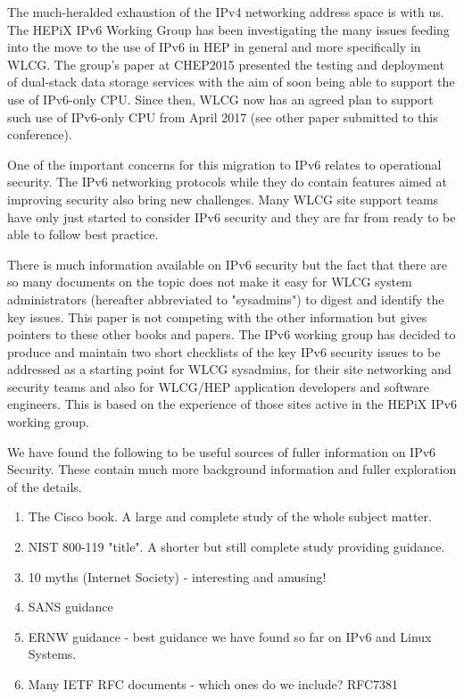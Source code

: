The much-heralded exhaustion of the IPv4 networking address space is with us. The HEPiX
IPv6 Working Group \cite{ipv6wg} has been investigating the many issues feeding into the move to the use of IPv6 in HEP in general and more specifically in WLCG. The group's paper at CHEP2015 \cite{ipv6chep2015} presented the testing and deployment of dual-stack data storage services with the aim of soon being able to support the use of IPv6-only CPU. Since then, WLCG now has an agreed plan to support such use of IPv6-only CPU from April 2017 (see other paper submitted to this conference).

One of the important concerns for this migration to IPv6 relates to operational security. The IPv6 networking protocols while they do contain features aimed at improving security also bring new challenges. Many WLCG site support teams have only just started to consider IPv6 security and they are far from ready to be able to follow best practice. 

There is much information available on IPv6 security but the fact that there are so many documents on the topic does not make it easy for WLCG system administrators (hereafter abbreviated to "sysadmins") to digest and identify the key issues. This paper is not competing with the other information but gives pointers to these other books and papers. The IPv6 working group has decided to produce and maintain two short checklists of the key IPv6 security issues to be addressed as a starting point for WLCG sysadmins, for their site networking and security teams and also for WLCG/HEP application developers and software engineers. This is based on the experience of those sites active in the HEPiX IPv6 working group. 

We have found the following to be useful sources of fuller information on IPv6 Security. These contain much more background information and fuller exploration of the details.

\begin {enumerate}
\item The Cisco book. A large and complete study of the whole subject matter.
\item NIST 800-119 "title". A shorter but still complete study providing guidance.
\item 10 myths (Internet Society) - interesting and amusing!
\item SANS guidance
\item ERNW guidance - best guidance we have found so far on IPv6 and Linux Systems.
\item Many IETF RFC documents - which ones do we include? RFC7381
\end {enumerate}

